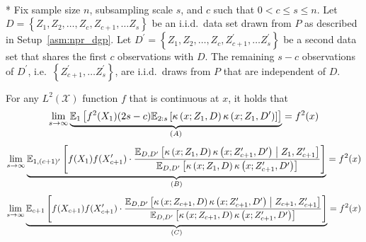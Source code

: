\newpage

\begin{lem}[]\label{lem:kernel_prod_dirac_convergence}\mbox{}\\*
    Fix sample size $n$, subsampling scale $s$, and $c$ such that $0 < c \leq s \leq n$.
	Let $D = \left\{Z_1, Z_2, \dotsc, Z_c, Z_{c+1}, \dotsc Z_s \right\}$ be an i.i.d.\ data set drawn from $P$ as described in Setup~\ref{asm:npr_dgp}.
	Let $D^{\prime} = \left\{Z_1, Z_2, \dotsc, Z_c, Z_{c+1}^{\prime}, \dotsc Z_s^{\prime} \right\}$ be a second data set that shares the first $c$ observations with $D$.
	The remaining $s - c$ observations of $D^{\prime}$, i.e.\ $\left\{Z_{c+1}^{\prime}, \dotsc Z_s^{\prime} \right\}$, are i.i.d.\ draws from $P$ that are independent of $D$.

    For any $L^{2}(\mathcal{X})$ function $f$ that is continuous at $x$, it holds that
    \begin{equation}
        \lim_{s \rightarrow \infty} \underbrace{\mathbb{E}_{1}\left[f^{2}(X_{1}) (2s - c) 
            \mathbb{E}_{2:s}\left[\kappa\left(x; Z_{1}, D\right)\kappa\left(x; Z_{1}, D^{\prime}\right)\right]
        \right]}_{(A)}
        = f^{2}(x)
    \end{equation}
    \begin{equation}
        \lim_{s \rightarrow \infty} \underbrace{\mathbb{E}_{1, (c+1)^{\prime}}\left[
            f(X_{1}) f(X_{c+1}^{\prime})
            \cdot \frac{\mathbb{E}_{D, D^{\prime}}\left[\kappa\left(x; Z_{1}, D\right)\kappa\left(x; Z_{c+1}^{\prime}, D^{\prime}\right) \; \middle| \; Z_{1}, Z_{c+1}^{\prime}\right]}{\mathbb{E}_{D, D^{\prime}}\left[\kappa\left(x; Z_{1}, D\right)\kappa\left(x; Z_{c+1}^{\prime}, D^{\prime}\right)\right]}
        \right]}_{(B)}
        = f^{2}(x)
    \end{equation}
    \begin{equation}
        \lim_{s \rightarrow \infty} \underbrace{\mathbb{E}_{c+1}\left[
            f(X_{c+1}) f(X_{c+1}^{\prime})
            \cdot \frac{\mathbb{E}_{D, D^{\prime}}\left[\kappa\left(x; Z_{c+1}, D\right)\kappa\left(x; Z_{c+1}^{\prime}, D^{\prime}\right) \; \middle| \; Z_{c+1}, Z_{c+1}^{\prime}\right]}{\mathbb{E}_{D, D^{\prime}}\left[\kappa\left(x; Z_{c+1}, D\right)\kappa\left(x; Z_{c+1}^{\prime}, D^{\prime}\right)\right]} 
        \right]}_{(C)}
        = f^{2}(x)
    \end{equation}
\end{lem}

